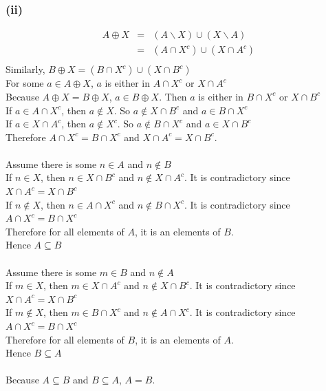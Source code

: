 \documentclass{article} %
\begin{document}
\subsubsection*{(ii)}
\[
    \begin{array}{rll}
        A \oplus X  &=& (A \backslash X) \cup (X \backslash A)\\
                    &=& (A \cap X^c) \cup (X \cap A^c)\\
    \end{array}
\]
Similarly, $B \oplus X = (B \cap X^c) \cup (X \cap B^c)$\\
For some $a \in A \oplus X$, $a$ is either in $A \cap X^c$ or $X \cap A^c$\\
Because $A \oplus X = B \oplus X$, $a \in B \oplus X$. Then $a$ is either in $B \cap X^c$ or $X \cap B^c$\\
If $a \in A \cap X^c$, then $a \notin X$. So $a \notin X \cap B^c$ and $a \in B \cap X^c$\\
If $a \in X \cap A^c$, then $a \notin X^c$. So $a \notin B \cap X^c$ and $a \in X \cap B^c$\\
Therefore $A \cap X^c = B \cap X^c$ and $X \cap A^c = X \cap B^c$.\\
\\
Assume there is some $n \in A$ and $n \notin B$\\
If $n \in X$, then $n \in X \cap B^c$ and $n \notin X \cap A^c$. It is contradictory since $X \cap A^c = X \cap B^c$\\
If $n \notin X$, then $n \in A \cap X^c$ and $n \notin B\cap X^c$. It is contradictory since $A \cap X^c = B \cap X^c$\\
Therefore for all elements of $A$, it is an elements of $B$.\\
Hence $A \subseteq B$\\
\\
Assume there is some $m \in B$ and $n \notin A$\\
If $m \in X$, then $m \in X \cap A^c$ and $n \notin X \cap B^c$. It is contradictory since $X \cap A^c = X \cap B^c$\\
If $m \notin X$, then $m \in B \cap X^c$ and $n \notin A\cap X^c$. It is contradictory since $A \cap X^c = B \cap X^c$\\
Therefore for all elements of $B$, it is an elements of $A$.\\
Hence $B \subseteq A$\\
\\
Because $A \subseteq B$ and $B \subseteq A$, $A = B$.
\end{document}
